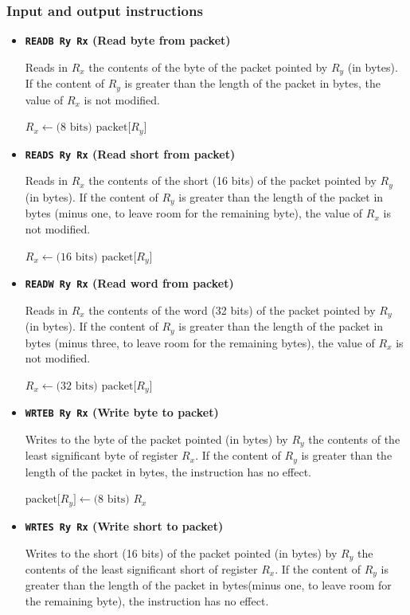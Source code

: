 \documentclass[11pt]{article}
\begin{document}
\subsubsection{Input and output instructions}

\begin{itemize}
 
\item \textbf{\texttt{READB Ry  Rx} (Read byte from packet)} 

Reads in $R_x$ the contents of the byte of the packet pointed by $R_y$ (in bytes). If the content of $R_y$ is greater than the length of the packet in bytes, the value of $R_x$ is not modified.

$R_x \leftarrow \mbox{(8 bits) packet[$R_y$]}$


\item \textbf{\texttt{READS Ry  Rx} (Read short from packet)}

Reads in $R_x$ the contents of the short (16 bits) of the packet pointed by $R_y$ (in bytes). If the content of $R_y$ is greater than the length of the packet in bytes (minus one, to leave room for the remaining byte), the value of $R_x$ is not modified.

$R_x \leftarrow \mbox{(16 bits) packet[$R_y$]}$


\item \textbf{\texttt{READW Ry  Rx} (Read word from packet)} 

Reads in $R_x$ the contents of the word (32 bits) of the packet pointed by $R_y$ (in bytes). If the content of $R_y$ is greater than the length of the packet in bytes (minus three, to leave room for the remaining bytes), the value of $R_x$ is not modified.

$R_x \leftarrow \mbox{(32 bits) packet[$R_y$]}$


\item \textbf{\texttt{WRTEB Ry  Rx} (Write byte to packet)} 

Writes to the byte of the packet pointed (in bytes) by $R_y$ the contents of the least significant byte of register $R_x$. If the content of $R_y$ is greater than the length of the packet in bytes, the instruction has no effect.

$\mbox{packet[$R_y$]} \leftarrow \mbox{(8 bits)\ } R_x$

\item \textbf{\texttt{WRTES Ry  Rx} (Write short to packet)}

Writes to the short (16 bits) of the packet pointed (in bytes) by $R_y$ the contents of the least significant short of register $R_x$. If the content of $R_y$ is greater than the length of the packet in bytes(minus one, to leave room for the remaining byte), the instruction has no effect.


\end{itemize}
\end{document}
